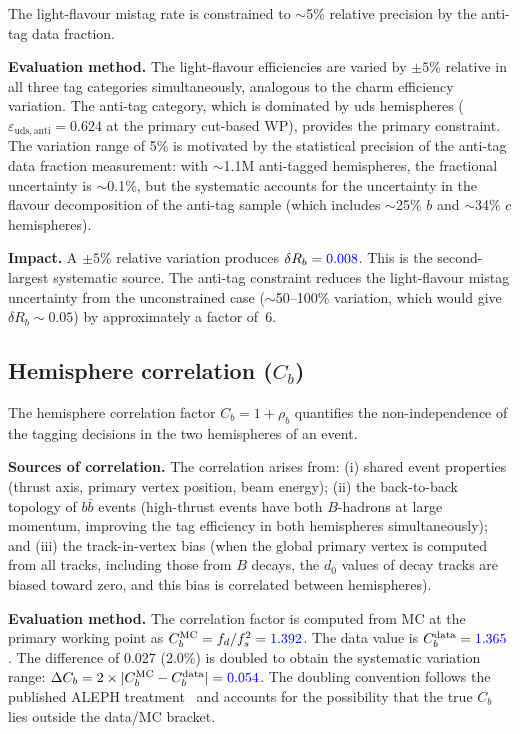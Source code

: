 \documentclass[11pt,a4paper]{article}
\newcommand{\measured}[1]{\textcolor{blue}{#1}}
\begin{document}
The light-flavour mistag rate is constrained to $\sim$5\% relative
precision by the anti-tag data fraction.

\textbf{Evaluation method.}
The light-flavour efficiencies are varied by $\pm 5\%$ relative in all
three tag categories simultaneously, analogous to the charm efficiency
variation.  The anti-tag category, which is dominated by uds hemispheres
($\varepsilon_\mathrm{uds,anti} = 0.624$ at the primary cut-based WP),
provides the primary constraint.  The variation range of 5\% is motivated
by the statistical precision of the anti-tag data fraction measurement:
with $\sim$1.1M anti-tagged hemispheres, the fractional uncertainty is
$\sim$0.1\%, but the systematic accounts for the uncertainty in the
flavour decomposition of the anti-tag sample (which includes $\sim$25\%
$b$ and $\sim$34\% $c$ hemispheres).

\textbf{Impact.}
A $\pm 5\%$ relative variation produces $\delta R_b = \measured{0.008}$.
This is the second-largest systematic source.  The anti-tag constraint
reduces the light-flavour mistag uncertainty from the unconstrained case
($\sim$50--100\% variation, which would give $\delta R_b \sim 0.05$) by
approximately a factor of~6.

\subsection{Hemisphere correlation ($C_b$)}
\label{sec:syst-cb}

The hemisphere correlation factor $C_b = 1 + \rho_b$ quantifies the
non-independence of the tagging decisions in the two hemispheres of an
event.

\textbf{Sources of correlation.}
The correlation arises from: (i) shared event properties (thrust axis,
primary vertex position, beam energy); (ii) the back-to-back topology
of $b\bar{b}$ events (high-thrust events have both $B$-hadrons at large
momentum, improving the tag efficiency in both hemispheres simultaneously);
and (iii) the track-in-vertex bias (when the global primary vertex is
computed from all tracks, including those from $B$ decays, the $d_0$
values of decay tracks are biased toward zero, and this bias is correlated
between hemispheres).

\textbf{Evaluation method.}
The correlation factor is computed from MC at the primary working point
as $C_b^\mathrm{MC} = f_d / f_s^2 = \measured{1.392}$.  The data value
is $C_b^\mathrm{data} = \measured{1.365}$.  The difference of 0.027
(2.0\%) is doubled to obtain the systematic variation range:
$\Delta C_b = 2 \times |C_b^\mathrm{MC} - C_b^\mathrm{data}| =
\measured{0.054}$.  The doubling convention follows the published ALEPH
treatment~\cite{ALEPH:Rb:1996} and accounts for the possibility that the
true $C_b$ lies outside the data/MC bracket.
\end{document}

